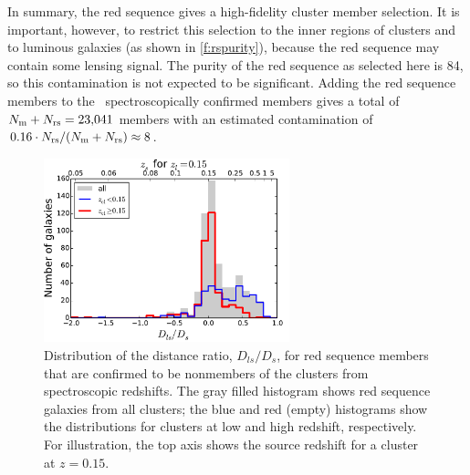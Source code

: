 In summary, the red sequence gives a high-fidelity cluster member selection. It is important, 
however, to restrict this selection to the inner regions of clusters and to luminous galaxies (as 
shown in \cref{f:rspurity}), because the red sequence may contain some lensing signal. The purity 
of the red sequence as selected here is 84\percent, so this contamination is not expected to be 
significant. Adding the red sequence members to the \Nmembers\ spectroscopically confirmed members 
gives a total of $N_{\rm m}+N_{\rm rs}=23,\!041$ members with an estimated contamination of 
$0.16\cdot N_{\rm rs}/(N_{\rm m}+N_{\rm rs})\approx8$\percent.

\begin{figure}
\begin{minipage}[b]{2.7in}
 \centerline{\includegraphics[width=2.8in]{chapter4/distance-ratio_rsnonmembers.pdf}}
\end{minipage}
\begin{minipage}[b]{2.1in}
 \caption{\small Distribution of the distance ratio, $D_{ls}/D_s$, for red sequence members that are 
confirmed to be nonmembers of the clusters from spectroscopic redshifts. The gray filled histogram 
shows red sequence galaxies from all clusters; the blue and red (empty) histograms show the 
distributions for clusters at low and high redshift, respectively. For illustration, the top axis 
shows the source redshift for a cluster at $z=0.15$.}
\label{f:rsbeta}
\end{minipage}
\end{figure}

